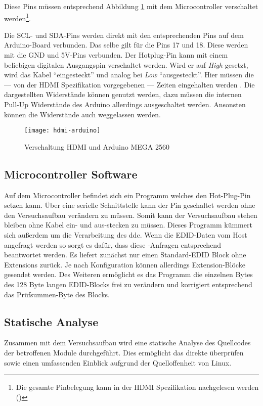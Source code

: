 Diese Pins müssen entsprechend Abbildung \ref{fig:hdmi-arduino} mit dem Microcontroller 
verschaltet werden\footnote{Die gesamte Pinbelegung kann in der HDMI Spezifikation nachgelesen werden (\cite[S.12]{Hdmi14Specification})}. \newpage

Die SCL- und SDA-Pins werden direkt mit den entsprechenden Pins auf dem Arduino-Board  verbunden.
Das selbe gilt für die Pins 17 und 18. Diese werden mit die GND und 5V-Pins verbunden. 
Der Hotplug-Pin kann mit einem beliebigen digitalen Ausgangspin verschaltet werden. 
Wird er auf \emph{High} gesetzt, wird das Kabel ``eingesteckt'' und analog bei \emph{Low} ``ausgesteckt''.
Hier müssen die --- von der HDMI Spezifikation vorgegebenen --- Zeiten eingehalten werden \cite[S.73]{Hdmi14Specification}.
Die dargestellten Widerstände können genutzt werden, dazu müssen die internen Pull-Up Widerstände des Arduino allerdings ausgeschaltet werden. 
Ansonsten können die Widerstände auch weggelassen werden.

\begin{figure}[H]
	\centering
	\texttt{[image: hdmi-arduino]}
	\caption{Verschaltung HDMI und Arduino MEGA 2560}
	\label{fig:hdmi-arduino}
\end{figure}

\subsection{Microcontroller Software}
Auf dem Microcontroller befindet sich ein Programm welches den Hot-Plug-Pin setzen kann. Über eine serielle Schnittstelle kann der Pin  geschaltet werden ohne den Versuchsaufbau 
verändern zu müssen.
Somit kann der Versuchsaufbau stehen bleiben ohne Kabel ein- und aus-stecken zu müssen. Dieses Programm kümmert sich außerdem um die Verarbeitung des \acrshort{ddc}. 
Wenn die EDID-Daten vom Host angefragt werden so sorgt es dafür, dass diese \interintegratedbus-Anfragen entsprechend beantwortet werden. Es liefert zunächst nur einen
Standard-EDID Block ohne Extensions zurück. Je nach Konfiguration können allerdings Extension-Blöcke gesendet werden. 
Des Weiteren ermöglicht es das Programm die einzelnen Bytes des 128 Byte langen EDID-Blocks frei zu verändern und korrigiert entsprechend das Prüfsummen-Byte des Blocks.

\subsection{Statische Analyse}
Zusammen mit dem Versuchsaufbau wird eine statische Analyse des Quellcodes der betroffenen Module durchgeführt. Dies ermöglicht das direkte überprüfen sowie einen umfassenden Einblick
aufgrund der Quelloffenheit von Linux.


